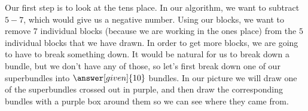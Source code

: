 \documentclass{ximera}
\begin{document}
\begin{example}
\begin{image}
\begin{tikzpicture}[every node/.style={font=\large}]
\end{tikzpicture} \end{image}

Our first step is to look at the tens place. In our algorithm, we want to subtract $5-7$, which would give us a negative number. Using our blocks, we want to remove $7$ individual blocks (because we are working in the ones place) from the $5$ individual blocks that we have drawn. In order to get more blocks, we are going to have to break something down. It would be natural for us to break down a bundle, but we don't have any of those, so let's first break down one of our superbundles into $\answer[given]{10}$ bundles. In our picture we will draw one of the superbundles crossed out in purple, and then draw the corresponding bundles with a purple box around them so we can see where they came from.

\begin{image}
\end{image}
\end{example}
\end{document}

